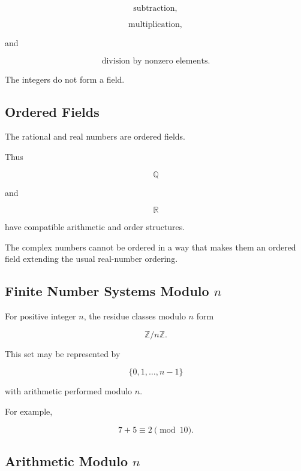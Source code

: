\[
\boxed{
\text{subtraction},
}
\]

\[
\boxed{
\text{multiplication},
}
\]

and

\[
\boxed{
\text{division by nonzero elements}.
}
\]

The integers do not form a field.

\subsection{Ordered Fields}
\label{subsec:ordered-fields-reference}

The rational and real numbers are ordered fields.

Thus

\[
\boxed{
\mathbb{Q}
}
\]

and

\[
\boxed{
\mathbb{R}
}
\]

have compatible arithmetic and order structures.

The complex numbers cannot be ordered in a way that makes them an ordered
field extending the usual real-number ordering.

\subsection{Finite Number Systems Modulo \(n\)}
\label{subsec:modular-number-systems}

For positive integer \(n\), the residue classes modulo \(n\) form

\[
\boxed{
\mathbb{Z}/n\mathbb{Z}.
}
\]

This set may be represented by

\[
\boxed{
\{0,1,\ldots,n-1\}
}
\]

with arithmetic performed modulo \(n\).

For example,

\[
\boxed{
7+5
\equiv
2
\pmod{10}.
}
\]

\subsection{Arithmetic Modulo \(n\)}
\label{subsec:modular-arithmetic-reference}


